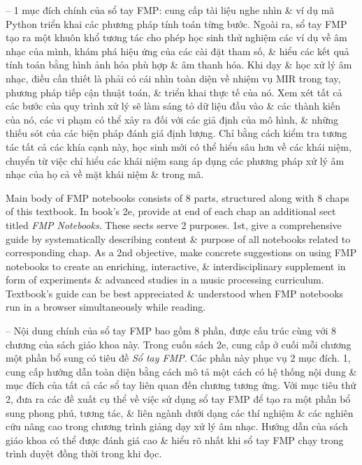 \documentclass{article}
\begin{document}
\begin{itemize}
	-- 1 mục đích chính của sổ tay FMP: cung cấp tài liệu nghe nhìn \& ví dụ mã Python triển khai các phương pháp tính toán từng bước. Ngoài ra, sổ tay FMP tạo ra một khuôn khổ tương tác cho phép học sinh thử nghiệm các ví dụ về âm nhạc của mình, khám phá hiệu ứng của các cài đặt tham số, \& hiểu các kết quả tính toán bằng hình ảnh hóa phù hợp \& âm thanh hóa. Khi dạy \& học xử lý âm nhạc, điều cần thiết là phải có cái nhìn toàn diện về nhiệm vụ MIR trong tay, phương pháp tiếp cận thuật toán, \& triển khai thực tế của nó. Xem xét tất cả các bước của quy trình xử lý sẽ làm sáng tỏ dữ liệu đầu vào \& các thành kiến của nó, các vi phạm có thể xảy ra đối với các giả định của mô hình, \& những thiếu sót của các biện pháp đánh giá định lượng. Chỉ bằng cách kiểm tra tương tác tất cả các khía cạnh này, học sinh mới có thể hiểu sâu hơn về các khái niệm, chuyển từ việc chỉ hiểu các khái niệm sang áp dụng các phương pháp xử lý âm nhạc của họ cả về mặt khái niệm \& trong mã.
	
	Main body of FMP notebooks consists of 8 parts, structured along with 8 chaps of this textbook. In book's 2e, provide at end of each chap an additional sect titled {\it FMP Notebooks}. These sects serve 2 purposes. 1st, give a comprehensive guide by systematically describing content \& purpose of all notebooks related to corresponding chap. As a 2nd objective, make concrete suggestions on using FMP notebooks to create an enriching, interactive, \& interdisciplinary supplement in form of experiments \& advanced studies in a music processing curriculum. Textbook's guide can be best appreciated \& understood when FMP notebooks run in a browser simultaneously while reading.
	
	-- Nội dung chính của sổ tay FMP bao gồm 8 phần, được cấu trúc cùng với 8 chương của sách giáo khoa này. Trong cuốn sách 2e, cung cấp ở cuối mỗi chương một phần bổ sung có tiêu đề {\it Sổ tay FMP}. Các phần này phục vụ 2 mục đích. 1, cung cấp hướng dẫn toàn diện bằng cách mô tả một cách có hệ thống nội dung \& mục đích của tất cả các sổ tay liên quan đến chương tương ứng. Với mục tiêu thứ 2, đưa ra các đề xuất cụ thể về việc sử dụng sổ tay FMP để tạo ra một phần bổ sung phong phú, tương tác, \& liên ngành dưới dạng các thí nghiệm \& các nghiên cứu nâng cao trong chương trình giảng dạy xử lý âm nhạc. Hướng dẫn của sách giáo khoa có thể được đánh giá cao \& hiểu rõ nhất khi sổ tay FMP chạy trong trình duyệt đồng thời trong khi đọc.
	

\end{itemize}
\end{document}
